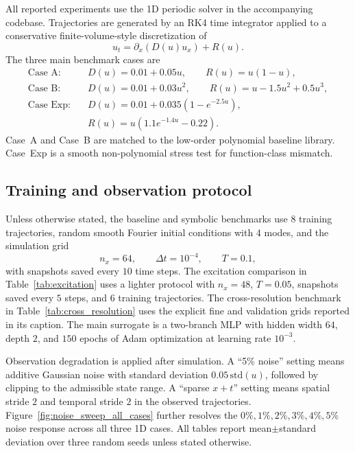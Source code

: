 \documentclass[preprint,12pt]{elsarticle}
\begin{document}
All reported experiments use the 1D periodic solver in the accompanying codebase. Trajectories are generated by an RK4 time integrator applied to a conservative finite-volume-style discretization of
\begin{equation}
u_t = \partial_x \left( D(u) u_x \right) + R(u).
\end{equation}
The three main benchmark cases are
\begin{align}
\text{Case A:}\quad & D(u) = 0.01 + 0.05u, \qquad R(u) = u(1-u), \\
\text{Case B:}\quad & D(u) = 0.01 + 0.03u^2, \qquad R(u) = u - 1.5u^2 + 0.5u^3, \\
\text{Case Exp:}\quad & D(u) = 0.01 + 0.035(1-e^{-2.5u}), \nonumber \\
& R(u) = u(1.1e^{-1.4u} - 0.22).
\end{align}
Case~A and Case~B are matched to the low-order polynomial baseline library. Case~Exp is a smooth non-polynomial stress test for function-class mismatch.

\subsection{Training and observation protocol}

Unless otherwise stated, the baseline and symbolic benchmarks use $8$ training trajectories, random smooth Fourier initial conditions with $4$ modes, and the simulation grid
\begin{equation}
n_x = 64,\qquad \Delta t = 10^{-4},\qquad T = 0.1,
\end{equation}
with snapshots saved every $10$ time steps. The excitation comparison in Table~\ref{tab:excitation} uses a lighter protocol with $n_x=48$, $T=0.05$, snapshots saved every $5$ steps, and $6$ training trajectories. The cross-resolution benchmark in Table~\ref{tab:cross_resolution} uses the explicit fine and validation grids reported in its caption. The main surrogate is a two-branch MLP with hidden width $64$, depth $2$, and $150$ epochs of Adam optimization at learning rate $10^{-3}$.

Observation degradation is applied after simulation. A ``5\% noise'' setting means additive Gaussian noise with standard deviation $0.05\,\mathrm{std}(u)$, followed by clipping to the admissible state range. A ``sparse $x+t$'' setting means spatial stride $2$ and temporal stride $2$ in the observed trajectories. Figure~\ref{fig:noise_sweep_all_cases} further resolves the $0\%,1\%,2\%,3\%,4\%,5\%$ noise response across all three 1D cases. All tables report mean$\pm$standard deviation over three random seeds unless stated otherwise.
\end{document}
